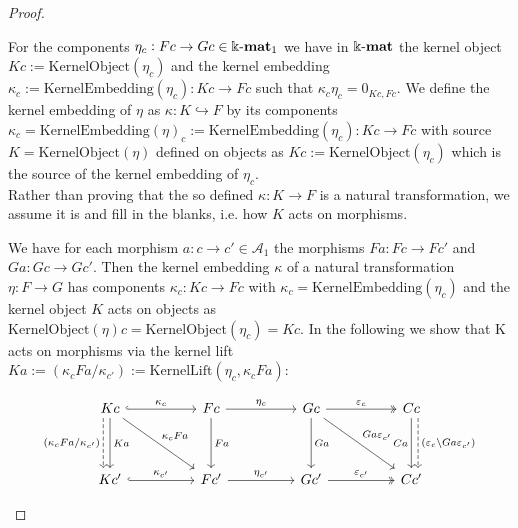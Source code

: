 \begin{proof}
\begin{enumerate}
\begin{subproof}[Proof of (ii)]
For the components $\eta_{c} : Fc \rightarrow Gc \in \Bbbk\textnormal{-}\mathbf{mat}_{1}$ we have in $\Bbbk\textnormal{-}\mathbf{mat}$ the kernel object $Kc := \mathrm{KernelObject}(\eta_{c})$
and the kernel embedding
$\kappa_{c} := \mathrm{KernelEmbedding}(\eta_{c}) : Kc \rightarrow Fc$ such that
$\kappa_{c} \eta_{c} = 0_{Kc,Fc}$.
We define the kernel embedding of $\eta$ as $\kappa : K \hookrightarrow F$ by its components
$\kappa_{c} = \mathrm{KernelEmbedding}(\eta)_{c} := \mathrm{KernelEmbedding}(\eta_{c}) : Kc \rightarrow Fc$ with source
$K = \mathrm{KernelObject}(\eta)$ defined on objects as $Kc := \mathrm{KernelObject}(\eta_{c})$ which is the source of the
kernel embedding of $\eta_{c}$.\\
Rather than proving that the so defined $\kappa : K \rightarrow F$ is a natural transformation, we assume it is and fill in the blanks, i.e. 
how $K$ acts on morphisms.

We have for each morphism $a : c \rightarrow c' \in \mathcal{A}_{1}$ the morphisms $Fa : Fc \rightarrow Fc'$ and
$Ga : Gc \rightarrow Gc'$. Then the kernel embedding $\kappa$ of a natural transformation $\eta : F \rightarrow G$ has components
$\kappa_{c} : Kc \rightarrow Fc$ with $\kappa_{c} = \mathrm{KernelEmbedding}(\eta_{c})$ and the kernel object $K$ acts on objects
as $\mathrm{KernelObject}(\eta)c = \mathrm{KernelObject}(\eta_{c}) = Kc$.
In the following we show that K acts on morphisms via the kernel lift
$Ka := (\kappa_{c}Fa/\kappa_{c'}) := \mathrm{KernelLift}(\eta_{c},\kappa_{c}Fa)$:

\[
\begin{tikzcd}
Kc \arrow[dd, "Ka"] \arrow[rr, "\kappa_{c}", hook] \arrow[rrdd, "\kappa_{c}Fa"] \arrow[dd, "(\kappa_{c}Fa/\kappa_{c'})"', dashed, shift right=2] &  & Fc \arrow[rr, "\eta_{c}"] \arrow[dd, "Fa"] &  & Gc \arrow[dd, "Ga"] \arrow[rr, "\varepsilon_{c}", two heads] \arrow[rrdd, "Ga\varepsilon_{c'}"] &  & Cc \arrow[dd, "Ca"'] \arrow[dd, "(\varepsilon_{c}\backslash Ga\varepsilon_{c'})", dashed, shift left=2] \\
                                                                                                                                                                                                       &  &                                            &  &                                                                                                                                                             &  &                                                                                                  \\
Kc' \arrow[rr, "\kappa_{c'}", hook]                                                                                                                                                                    &  & Fc' \arrow[rr, "\eta_{c'}"]                &  & Gc' \arrow[rr, "\varepsilon_{c'}", two heads]                                                                                                               &  & Cc'                                                                                             
\end{tikzcd}
\]


\end{subproof}
\end{enumerate}
\end{proof}
